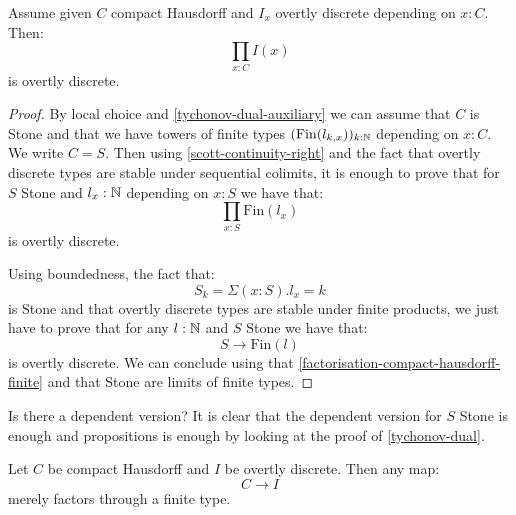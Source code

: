 \begin{theorem}\label{tychonov-dual}
Assume given $C$ compact Hausdorff and $I_x$ overtly discrete depending on $x:C$. Then:
\[\prod_{x:C}I(x)\]
is overtly discrete.
\end{theorem}

\begin{proof}
By local choice and \cref{tychonov-dual-auxiliary} we can assume that $C$ is Stone and that we have towers of finite types $(\mathrm{Fin}(l_{k,x}))_{k:\mathbb{N}}$ depending on $x:C$. We write $C=S$. Then using \cref{scott-continuity-right} and the fact that overtly discrete types are stable under sequential colimits, it is enough to prove that for $S$ Stone and $l_x:\mathbb{N}$ depending on $x:S$ we have that:
\[\prod_{x:S}\mathrm{Fin}(l_{x})\]
is overtly discrete. 

Using boundedness, the fact that:
\[S_k = \Sigma(x:S). l_x = k\] 
is Stone and that overtly discrete types are stable under finite products, we just have to prove that for any $l:\mathbb{N}$ and $S$ Stone we have that:
\[S\to \mathrm{Fin}(l)\]
is overtly discrete. We can conclude using that \cref{factorisation-compact-hausdorff-finite} and that Stone are limits of finite types.
\end{proof}

\begin{remark}
Is there a dependent version? It is clear that the dependent version for $S$ Stone is enough and propositions is enough by looking at the proof of \cref{tychonov-dual}.
\end{remark}

\begin{theorem}[Factorisation]
Let $C$ be compact Hausdorff and $I$ be overtly discrete. Then any map:
\[C\to I\]
merely factors through a finite type.
\end{theorem}

